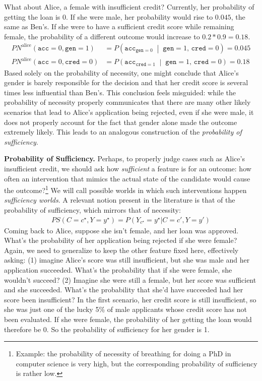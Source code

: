 \documentclass[anon,12pt]{clear2025} %
\begin{document}
What about Alice, a female with insufficient credit? Currently, her probability of getting the loan is $0$. If she were male, her probability would rise to $0.045$, the same as Ben's. If she were to have a sufficient credit score while remaining female, the probability of a different outcome would increase to $0.2 * 0.9 = 0.18$.
\begin{align*}
\mathit{PN}^{\text{alice}}(\mathtt{acc} = 0, \mathtt{gen} = 1) 
  &= P\!\left(
      \mathtt{acc}_{\mathtt{gen} = 0} \;\middle|\;
      \mathtt{gen} = 1,\, \mathtt{cred} = 0
    \right) = 0.045 \\
\mathit{PN}^{\text{alice}}(\mathtt{acc} = 0, \mathtt{cred} = 0) 
  &= P\!\left(
      \mathtt{acc}_{\mathtt{cred} = 1} \;\middle|\;
      \mathtt{gen} = 1,\, \mathtt{cred} = 0
    \right) = 0.18
\end{align*}
Based solely on the probability of necessity, one might conclude that Alice's gender is barely responsible for the decision and that her credit score is several times less influential than Ben's. This conclusion feels misguided: while the probability of necessity properly communicates that there are many other likely scenarios that lead to Alice's application being rejected, even if she were male, it does not properly account for the fact that gender alone made the outcome extremely likely. This leads to an analogous construction of the \emph{probability of sufficiency}.




\noindent \textbf{Probability of Sufficiency.} Perhaps, to properly judge cases such as Alice's insufficient credit, we should ask how \emph{sufficient} a feature is for an outcome: how often an intervention that mimics the actual state of the candidate would cause the outcome?\footnote{Example:  the probability of necessity of breathing for doing a PhD in computer science is very high, but the corresponding probability of sufficiency is rather low.}   We will call possible worlds in which such interventions happen \emph{sufficiency worlds}. A relevant notion present in the literature is that of the probability of sufficiency, which mirrors that of necessity:
\begin{align*} \mathit{PS}(C=c^\star, Y=y^\star) = P(Y_{c^\star} = y^\star \vert C=c', Y=y')\end{align*}
Coming back to Alice, suppose she isn't female, and her loan was approved. What's the probability of her application being rejected if she were female? Again, we need to generalize to keep the other feature fixed here, effectively asking: (1) imagine Alice's score was still insufficient, but she was male and her application succeeded. What's the probability that if she were female, she wouldn't succeed? (2) Imagine she were still a female, but her score was sufficient and she succeeded. What's the probability that she'd have succeeded had her score been insufficient? In the first scenario, her credit score is still insufficient, so she was just one of the lucky 5\% of male applicants whose credit score has not been evaluated. If she were female, the probability of her getting the loan would therefore be 0. So the probability of sufficiency for her gender is 1.
\end{document}
